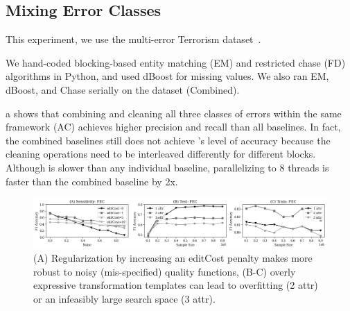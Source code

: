 \subsection*{Mixing Error Classes}\label{s:expterror}
This experiment, we use the multi-error Terrorism dataset~\cite{data-terrorism}. 

 We hand-coded blocking-based entity matching (EM)  and restricted chase (FD) algorithms in Python, and used dBoost for missing values.  We also ran EM, dBoost, and Chase serially on the dataset (Combined). 



 a shows that combining and cleaning all three classes of errors within the same \sys framework (AC) achieves higher precision and recall than all baselines.  In fact, the combined baselines still does not achieve \sys's level of accuracy because the cleaning operations need to be interleaved differently for different blocks.   Although \sys is slower than any individual baseline, parallelizing \sys to 8 threads is faster than the combined baseline by 2x. 



 \begin{figure}[t]
\centering
 \includegraphics[width=\textwidth]{ac-experiments/exp5.png}
 \caption{\small (A) Regularization by increasing an editCost penalty makes \sys more robust to noisy (mis-specified) quality functions, (B-C) overly expressive transformation templates can lead to overfitting (2 attr) or an infeasibly large search space (3 attr).  
 \label{fig:sensitivity}}
\end{figure}

